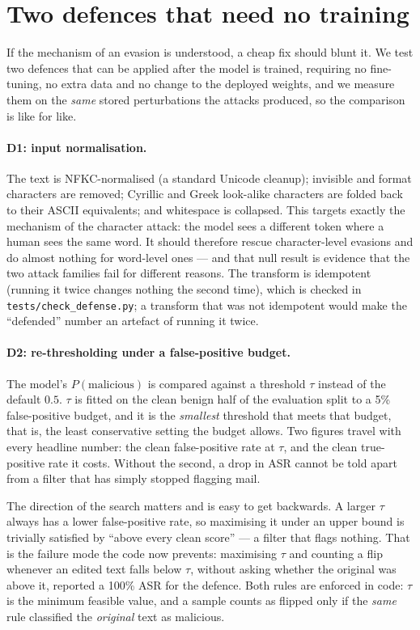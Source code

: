 \section{Two defences that need no training}
\label{sec:defense}

If the mechanism of an evasion is understood, a cheap fix should blunt it. We
test two defences that can be applied after the model is trained, requiring no
fine-tuning, no extra data and no change to the deployed weights, and we measure
them on the \emph{same} stored perturbations the attacks produced, so the
comparison is like for like.

\paragraph{D1: input normalisation.} The text is NFKC-normalised (a standard
Unicode cleanup); invisible and format characters are removed; Cyrillic and Greek
look-alike characters are folded back to their ASCII equivalents; and whitespace
is collapsed. This targets exactly the mechanism of the character attack: the
model sees a different token where a human sees the same word. It should
therefore rescue character-level evasions and do almost nothing for word-level
ones --- and that null result is evidence that the two attack families fail for
different reasons. The transform is idempotent (running it twice changes nothing
the second time), which is checked in \texttt{tests/check\_defense.py}; a
transform that was not idempotent would make the ``defended'' number an artefact
of running it twice.

\paragraph{D2: re-thresholding under a false-positive budget.} The model's
$P(\text{malicious})$ is compared against a threshold $\tau$ instead of the
default $0.5$. $\tau$ is fitted on the clean benign half of the evaluation split
to a 5\% false-positive budget, and it is the \emph{smallest} threshold that meets
that budget, that is, the least conservative setting the budget allows. Two
figures travel with every headline number: the clean false-positive rate at
$\tau$, and the clean true-positive rate it costs. Without the second, a drop in
ASR cannot be told apart from a filter that has simply stopped flagging mail.

The direction of the search matters and is easy to get backwards. A larger
$\tau$ always has a lower false-positive rate, so maximising it under an upper
bound is trivially satisfied by ``above every clean score'' --- a filter that
flags nothing. That is the failure mode the code now prevents: maximising
$\tau$ and counting a flip whenever an edited text falls below $\tau$, without
asking whether the original was above it, reported a 100\% ASR for the defence.
Both rules are enforced in code: $\tau$ is the minimum feasible value, and a
sample counts as flipped only if the \emph{same} rule classified the
\emph{original} text as malicious.

